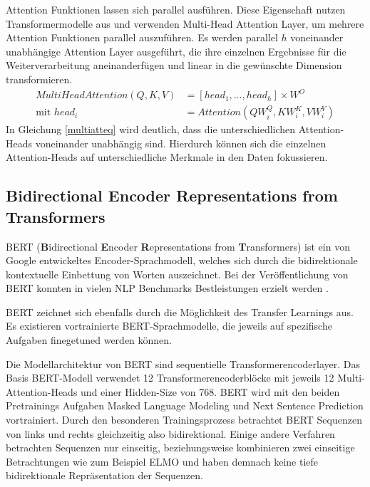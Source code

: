 Attention Funktionen lassen sich parallel ausführen. Diese Eigenschaft nutzen Transformermodelle aus und verwenden Multi-Head Attention Layer, um mehrere Attention Funktionen parallel auszuführen.
Es werden parallel $h$ voneinander unabhängige Attention Layer ausgeführt, die ihre einzelnen Ergebnisse für die Weiterverarbeitung aneinanderfügen und linear in die gewünschte Dimension transformieren. 
\begin{equation}
    \label{multiatteq}
    \begin{split}
    MultiHeadAttention(Q,K,V) &= [head_1, \ldots, head_h] \times W^{O} \\
    \text{mit } head_i &= Attention(QW_i^Q,KW_i^K,VW_i^V)
    \end{split}
\end{equation}
In Gleichung \ref{multiatteq} wird deutlich, dass die unterschiedlichen Attention-Heads voneinander unabhängig sind. Hierdurch können sich die einzelnen Attention-Heads auf unterschiedliche Merkmale in den Daten fokussieren.



    


\subsection{\textbf{B}idirectional \textbf{E}ncoder \textbf{R}epresentations from \textbf{T}ransformers}
BERT (\textbf{B}idirectional \textbf{E}ncoder \textbf{R}epresentations from \textbf{T}ransformers) ist ein von Google \citep{DBLP:journals/corr/abs-1810-04805} entwickeltes Encoder-Sprachmodell, welches sich durch die bidirektionale kontextuelle Einbettung von Worten auszeichnet.
Bei der Veröffentlichung von BERT konnten in vielen NLP Benchmarks Bestleistungen erzielt werden \citep{DBLP:journals/corr/abs-1810-04805}. 

BERT zeichnet sich ebenfalls durch die Möglichkeit des Transfer Learnings aus. Es existieren vortrainierte BERT-Sprachmodelle, die jeweils auf spezifische Aufgaben finegetuned werden können.

Die Modellarchitektur von BERT sind sequentielle Transformerencoderlayer. Das Basis BERT-Modell verwendet 12 Transformerencoderblöcke mit jeweils 12 Multi-Attention-Heads und einer Hidden-Size von 768.
BERT wird mit den beiden Pretrainings Aufgaben Masked Language Modeling und Next Sentence Prediction vortrainiert. Durch den besonderen Trainingsprozess betrachtet BERT Sequenzen von links und rechts gleichzeitig also bidirektional. Einige andere Verfahren betrachten Sequenzen nur einseitig, beziehungsweise kombinieren zwei einseitige Betrachtungen wie zum Beispiel ELMO \citep{elmo} und haben demnach keine tiefe bidirektionale Repräsentation der Sequenzen.

